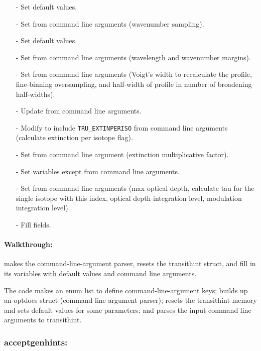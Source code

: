 \documentclass[letterpaper,12pt]{article}
\begin{document}
\begin{enumerate}[leftmargin=10pt, noitemsep, parsep=0pt, topsep=0ex]
\item[-] Set  default values.
\item[-] Set  from command line arguments (wavenumber sampling).
\item[-] Set  default values.
\item[-] Set  from command line arguments
  (wavelength and wavenumber margins).
\item[-] Set  from command line arguments (Voigt's width to
  recalculate the profile, fine-binning oversampling, and half-width
  of profile in number of broadening half-widths).
\item[-] Update  from command line arguments.
\item[-] Modify  to include {\tt TRU\_EXTINPERISO}
  from command line arguments (calculate extinction per isotope flag).
\item[-] Set  from command line argument (extinction
  multiplicative factor).
\item[-] Set  variables except  from command line arguments.
\item[-] Set 
  from command line arguments (max optical depth, calculate tau for
  the single isotope with this index, optical depth integration level,
  modulation integration level).
\item[-] Fill  fields.
\end{enumerate}

\paragraph{Walkthrough:}
makes the command-line-argument parser, resets the transithint struct, and fill in its variables with default values and command line arguments.  

The code makes an enum list to define command-line-argument keys;  
builds up an optdocs struct (command-line-argument parser);  
resets the transithint memory and sets default values for some parameters;  
and parses the input command line arguments to transithint.

\subsubsection{acceptgenhints:}
\end{document}

